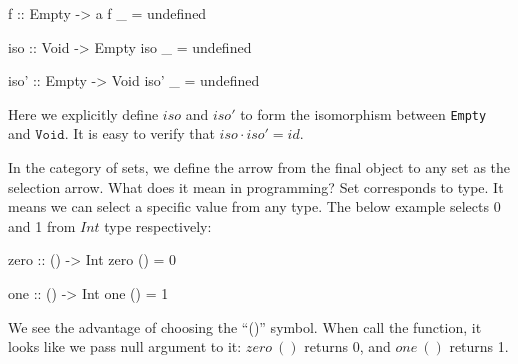 \documentclass[b5paper]{article}
\begin{document}
\begin{example}
\begin{Haskell}
f :: Empty -> a
f _ = undefined

iso :: Void -> Empty
iso _ = undefined

iso' :: Empty -> Void
iso' _ = undefined
\end{Haskell}

Here we explicitly define $iso$ and $iso'$ to form the isomorphism between \texttt{Empty} and $\texttt{Void}$. It is easy to verify that $iso \cdot iso' = id$.

In the category of sets, we define the arrow from the final object to any set as the selection arrow. What does it mean in programming? Set corresponds to type. It means we can select a specific value from any type. The below example selects 0 and 1 from $Int$ type respectively:

\begin{Haskell}
zero :: () -> Int
zero () = 0

one :: () -> Int
one () = 1
\end{Haskell}

We see the advantage of choosing the ``()'' symbol. When call the function, it looks like we pass null argument to it: $zero\ ()$ returns 0, and $one\ ()$ returns 1.
\end{example}

\begin{Exercise}\label{ex:01-obj}
\end{Exercise}
\end{document}
